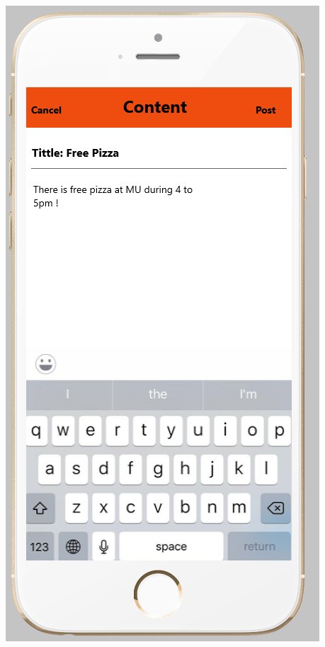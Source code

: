 \documentclass[12pt]{article}
\begin{document}
\begin{center}
\includegraphics[scale=0.30]{img/ui/post}

\end{center}
\end{document}
